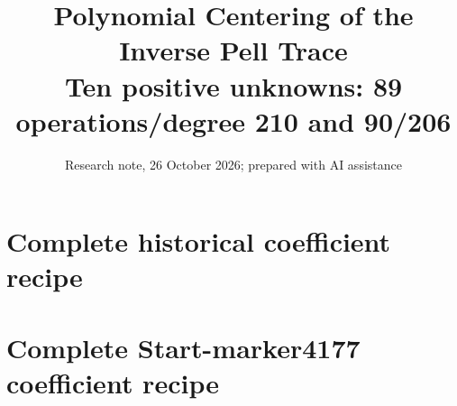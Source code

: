 \documentclass[10pt]{article}
\title{Polynomial Centering of the Inverse Pell Trace\\\large Ten positive unknowns: 89 operations/degree 210 and 90/206}
\author{Research note, 26 October 2026; prepared with AI assistance}
\date{}
\begin{document}
\maketitle

\appendix
\section{Complete historical coefficient recipe}

\clearpage\section{Complete Start-marker4177 coefficient recipe}

\end{document}
